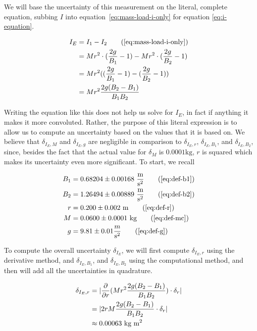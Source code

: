 \documentclass[coverpage]{article}
\newcommand{\iUnit}{\text{kg $\text{m}^2$}}
\newcommand{\mpssq}{\frac{\text{m}}{\text{s}^2}}
\begin{document}
	We will base the uncertainty of this measurement on the literal, complete equation, subbing $I$ into equation~\ref{eq:mass-load-i-only} for equation \ref{eq:i-equation}.
	
	\begin{align}
		I_E &= I_1 - I_2 \tag{\ref{eq:mass-load-i-only}} \\
		&= M r^2 \cdot (\frac{2g}{B_1} - 1) - Mr^2 \cdot (\frac{2g}{B_2} - 1) \notag \\
		&= M r^2 ((\frac{2g}{B_1} - 1) - (\frac{2g}{B_2} - 1)) \notag \\
		&= M r^2 \frac{2g(B_2 - B_1)}{B_1 B_2}
	\end{align}

	Writing the equation like this does not help us solve for $I_E$, in fact if anything it makes it more convoluted. Rather, the purpose of this literal expression is to allow us to compute an uncertainty based on the values that it is based on. We believe that $\delta_{I_E, M}$ and $\delta_{I_E, g}$ are negligible in comparison to $\delta_{I_E, r}$, $\delta_{I_E, B_1}$, and $\delta_{I_E, B_2}$, since, besides the fact that the actual value for $\delta_M$ is $0.0001 \text{kg}$, $r$ is squared which makes its uncertainty even more significant. To start, we recall
	
	\begin{align}
		B_1 &= 0.68204 \pm 0.00168\ \mpssq \tag{\ref{eq:def-b1}} \\
		B_2 &= 1.26494 \pm 0.00889\ \mpssq \tag{\ref{eq:def-b2}} \\
		r &= 0.200 \pm 0.002\ \text{m} \tag{\ref{eq:def-r}} \\
		M &= 0.0600 \pm 0.0001\ \text{kg} \tag{\ref{eq:def-mc}} \notag \\
		g &= 9.81 \pm 0.01 \frac{m}{\text{s}^2} \tag{\ref{eq:def-g}}
	\end{align}
	
	To compute the overall uncertainty $\delta_{I_E}$, we will first compute $\delta_{I_E, r}$ using the derivative method, and $\delta_{I_E, B_1}$, and $\delta_{I_E, B_2}$ using the computational method, and then will add all the uncertainties in quadrature.
	
	\begin{align}
		\delta_{I_E, r} &= |\frac{\partial}{\partial r}(M r^2 \frac{2g(B_2 - B_1)}{B_1 B_2}) \cdot \delta_r| \notag \\
		&= |2r M \frac{2g(B_2 - B_1)}{B_1 B_2} \cdot \delta_r| \notag \\
		&\approx 0.00063\ \iUnit
	\end{align}
\end{document}
